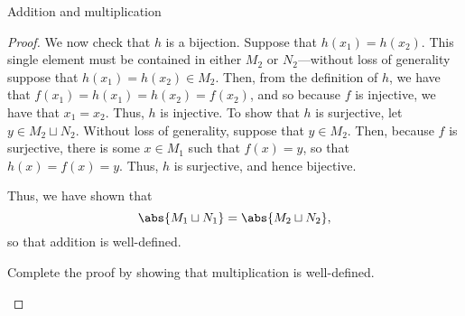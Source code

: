 \begin{prp}{Addition and multiplication}{}
\begin{proof}
We now check that $h$ is a bijection.  Suppose that $h(x_1)=h(x_2)$.  This single element must be contained in either $M_2$ or $N_2$---without loss of generality suppose that $h(x_1)=h(x_2)\in M_2$.  Then, from the definition of $h$, we have that $f(x_1)=h(x_1)=h(x_2)=f(x_2)$, and so because $f$ is injective, we have that $x_1=x_2$.  Thus, $h$ is injective.  To show that $h$ is surjective, let $y\in M_2\sqcup N_2$.  Without loss of generality, suppose that $y\in M_2$.  Then, because $f$ is surjective, there is some $x\in M_1$ such that $f(x)=y$, so that $h(x)=f(x)=y$.  Thus, $h$ is surjective, and hence bijective.

Thus, we have shown that
\begin{equation}
\abs{M_1\sqcup N_1}=\abs{M_2\sqcup N_2},
\end{equation}
so that addition is well-defined.

\begin{exr}[breakable=false]{}{}
Complete the proof by showing that multiplication is well-defined.
\end{exr}
\end{proof}
\end{prp}

